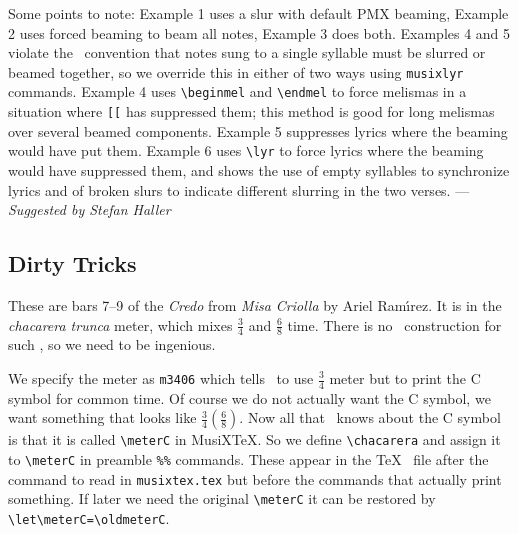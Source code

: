 \documentclass[11pt]{article}
\begin{document}





\bigskip\bigskip

Some points to note: Example 1 uses a slur with default PMX beaming, 
Example 2 uses forced beaming to beam all notes, 
Example 3 does both.  Examples 4 and 5 violate the \MTx\ convention
that notes sung to a single syllable must be slurred or beamed together,
so we override this in either of two ways using \texttt{musixlyr}
commands.  Example 4 uses \verb"\beginmel" and \verb"\endmel"
to force melismas in a situation where \verb"[[" has suppressed them;
this method is good for long melismas
over several beamed components.  Example 5 suppresses lyrics where
the beaming would have put them.  
Example 6 uses \verb"\lyr" to force lyrics where the beaming
would have suppressed them, and shows the use of empty
syllables to synchronize lyrics and of broken slurs to indicate different
slurring in the two verses.
\hfill --- \textsl{Suggested by Stefan Haller}

\pagebreak
\subsection{Dirty Tricks} \label{dirty}  


\begin{center}
\begin{mus}
 
\end{mus}
\end{center}

These are bars 7--9 of the \emph{Credo} from \emph{Misa Criolla}
by Ariel Ram{\'\i}rez.  It is in the \emph{chacarera trunca} meter, which
mixes $\frac34$ and $\frac68$ time.  There is no \PMX\ construction for 
such , so we need to be ingenious.  

We specify the meter as \verb"m3406"
which tells \PMX\ to use $\frac34$ meter but to print the C symbol for common
time.  Of course we do not actually want the C symbol, we want something
that looks like $\frac34(\frac68).$  Now all that \PMX\ knows about the C 
symbol is that it is called \verb"\meterC" in MusiX\TeX.  So we define
\verb"\chacarera" and assign it to
\verb"\meterC" in preamble \verb"%%" commands. These appear in the \TeX\
file after the command to read in \texttt{musixtex.tex} but before the 
commands that actually print something.   If later we need the original
\verb"\meterC" it can be restored by \verb"\let\meterC=\oldmeterC".
\end{document}
